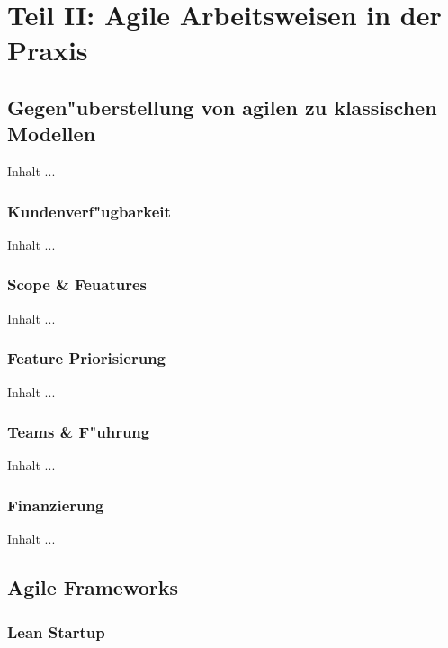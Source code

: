 
\chapter{Teil II: Agile Arbeitsweisen in der Praxis}
\minitoc 
\vspace{1 cm} 

\section{Gegen"uberstellung von agilen zu klassischen Modellen}
Inhalt ...

\subsection{Kundenverf"ugbarkeit}
Inhalt ...


\subsection{Scope \& Feuatures}
Inhalt ...

\subsection{Feature Priorisierung}
Inhalt ...

\subsection{Teams \& F"uhrung}
Inhalt ...

\subsection{Finanzierung}
Inhalt ...


\section{Agile Frameworks}

\subsection{Lean Startup}

